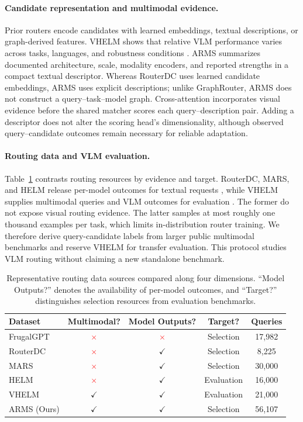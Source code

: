 \documentclass[letterpaper]{article}
\newcommand{\cmark}{\textcolor{green!65!black}{\ensuremath{\checkmark}}}
\newcommand{\xmark}{\textcolor{red}{\ensuremath{\times}}}
\begin{document}
\paragraph{Candidate representation and multimodal evidence.}
Prior routers encode candidates with learned embeddings, textual descriptions,
or graph-derived features. VHELM shows that relative VLM performance varies
across tasks, languages, and robustness conditions \citep{VHELM}. ARMS
summarizes documented architecture, scale, modality encoders, and reported
strengths in a compact textual descriptor. Whereas RouterDC uses learned
candidate embeddings, ARMS uses explicit descriptions; unlike GraphRouter, ARMS
does not construct a query--task--model graph. Cross-attention incorporates
visual evidence before the shared matcher scores each query--description pair.
Adding a descriptor does not alter the scoring head's dimensionality, although
observed query--candidate outcomes remain necessary for reliable adaptation.

\paragraph{Routing data and VLM evaluation.}
Table~\ref{tab:sources} contrasts routing resources by evidence and target.
RouterDC, MARS, and HELM release per-model outcomes for textual requests
\citep{RouterDC,MARS,HELM}, while VHELM supplies multimodal queries and VLM
outcomes for evaluation
\citep{VHELM}. The former do not expose visual routing evidence. The latter
samples at most roughly one thousand examples per task, which limits
in-distribution router training. We therefore derive query-candidate labels from
larger public multimodal benchmarks and reserve VHELM for transfer evaluation.
This protocol studies VLM routing without claiming a new standalone benchmark.

\begin{table}[t]
\centering
\footnotesize
\setlength{\tabcolsep}{1.7pt}
\begin{tabular}{lcccc}
\toprule
Dataset & Multimodal? & Model Outputs? & Target? & Queries\\
\midrule
FrugalGPT    & \xmark & \xmark & Selection  & 17,982\\
RouterDC     & \xmark & \cmark & Selection  & 8,225\\
MARS         & \xmark & \cmark & Selection  & 30,000\\
HELM         & \xmark & \cmark & Evaluation & 16,000\\
VHELM        & \cmark & \cmark & Evaluation & 21,000\\
ARMS (Ours)  & \cmark & \cmark & Selection  & 56,107\\
\bottomrule
\end{tabular}
\caption{Representative routing data sources compared along four dimensions.
``Model Outputs?'' denotes the availability of per-model outcomes, and
``Target?'' distinguishes selection resources from evaluation benchmarks.}
\label{tab:sources}
\end{table}
\end{document}
